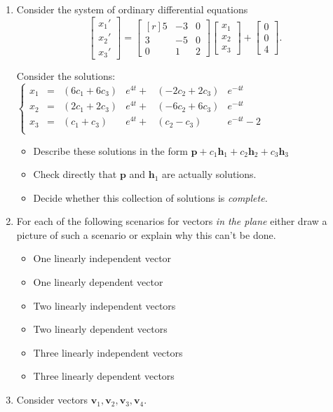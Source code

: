 \documentclass[12pt]{article}
\begin{document}
\begin{enumerate}[1.]
\item Consider the system of ordinary differential equations
\[
  \begin{bmatrix}x_1'\\x_2'\\x_3'\end{bmatrix}
    =
  \begin{bmatrix*}[r]5&-3&0\\3&-5&0\\0&1&2\end{bmatrix*}
  \begin{bmatrix}x_1\\x_2\\x_3\end{bmatrix}
      +
      \begin{bmatrix}0\\0\\4\end{bmatrix}.
    \]

Consider the solutions:    
\(\left \{ \begin{aligned} 
x_1&=&(6c_1+6c_3)&e^{4t}+&(-2c_2+2c_3)&e^{-4t}\\
x_2&=&(2c_1+2c_3)&e^{4t}+&(-6c_2+6c_3)&e^{-4t}\\
x_3&=&(c_1+c_3)  &e^{4t}+&(c_2-c_3)   &e^{-4t}-2\\
\end{aligned} \right.\)
    
\begin{itemize}
\item Describe these solutions in the form \(\mathbf{p} + c_1\mathbf{h}_1 + c_2 \mathbf{h}_2 + c_3 \mathbf{h}_3\)
  \vfill
\item Check directly that \(\mathbf{p}\)   and \(\mathbf{h}_1\) are actually solutions.
  \vfill
\item Decide whether this collection of solutions is \emph{complete.}
  \vfill
\end{itemize}

\newpage
\item For each of the following scenarios for vectors \emph{in the plane} either draw a picture of such a scenario or explain why this can't be done.
\begin{itemize}
\item One linearly independent vector
\vfill    
\item One linearly dependent vector
\vfill    
\item Two linearly independent vectors
\vfill    
\item Two linearly dependent vectors
\vfill    
\item Three linearly independent vectors
\vfill    
\item Three linearly dependent vectors
\vfill  
\end{itemize}
\newpage
\item Consider vectors \(\mathbf{v}_1,\mathbf{v}_2,\mathbf{v}_3,\mathbf{v}_4\).


\end{enumerate}
\end{document}
